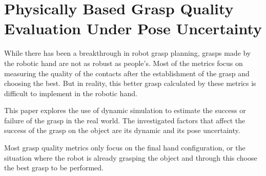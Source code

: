 \section{Physically Based Grasp Quality Evaluation Under
Pose Uncertainty}
While there has been a breakthrough in robot grasp planning, grasps made by the robotic hand are not as robust as people's.
Most of the metrics focus on measuring the quality of the contacts after the establishment of the grasp and choosing the best. But in reality, this better grasp calculated by these metrics is difficult to implement in the robotic hand. \par
This paper explores the use of dynamic simulation to estimate the success or failure of the grasp in the real world. The investigated factors that affect the success of the grasp on the object are its dynamic and its pose uncertainty.\par
Most grasp quality metrics only focus on the final hand configuration, or the situation where the robot is already grasping the object and through this choose the best grasp to be performed.